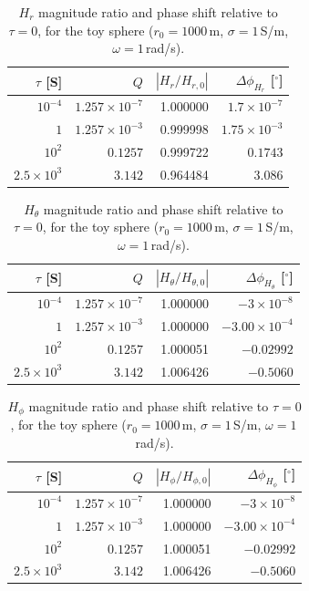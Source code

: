 \documentclass[11pt]{article}
\begin{document}
\begin{table}[h]
\centering
\begin{tabular}{rrrr}
\toprule
$\tau$ [S] & $Q$ & $|H_r/H_{r,0}|$ & $\Delta\phi_{H_r}$ [$^\circ$] \\
\midrule
$10^{-4}$         & $1.257\times10^{-7}$ & 1.000000 & $1.7\times10^{-7}$ \\
$1$               & $1.257\times10^{-3}$ & 0.999998 & $1.75\times10^{-3}$ \\
$10^{2}$          & $0.1257$             & 0.999722 & $0.1743$ \\
$2.5\times10^{3}$ & $3.142$              & 0.964484 & $3.086$ \\
\bottomrule
\end{tabular}
\caption{$H_r$ magnitude ratio and phase shift relative to $\tau=0$, for the toy sphere
($r_0=1000$\,m, $\sigma=1$\,S/m, $\omega=1$\,rad/s).}
\label{tab:phaseHr}
\end{table}

\begin{table}[h]
\centering
\begin{tabular}{rrrr}
\toprule
$\tau$ [S] & $Q$ & $|H_\theta/H_{\theta,0}|$ & $\Delta\phi_{H_\theta}$ [$^\circ$] \\
\midrule
$10^{-4}$         & $1.257\times10^{-7}$ & 1.000000 & $-3\times10^{-8}$ \\
$1$               & $1.257\times10^{-3}$ & 1.000000 & $-3.00\times10^{-4}$ \\
$10^{2}$          & $0.1257$             & 1.000051 & $-0.02992$ \\
$2.5\times10^{3}$ & $3.142$              & 1.006426 & $-0.5060$ \\
\bottomrule
\end{tabular}
\caption{$H_\theta$ magnitude ratio and phase shift relative to $\tau=0$, for the toy sphere
($r_0=1000$\,m, $\sigma=1$\,S/m, $\omega=1$\,rad/s).}
\label{tab:phaseHth}
\end{table}

\begin{table}[h]
\centering
\begin{tabular}{rrrr}
\toprule
$\tau$ [S] & $Q$ & $|H_\phi/H_{\phi,0}|$ & $\Delta\phi_{H_\phi}$ [$^\circ$] \\
\midrule
$10^{-4}$         & $1.257\times10^{-7}$ & 1.000000 & $-3\times10^{-8}$ \\
$1$               & $1.257\times10^{-3}$ & 1.000000 & $-3.00\times10^{-4}$ \\
$10^{2}$          & $0.1257$             & 1.000051 & $-0.02992$ \\
$2.5\times10^{3}$ & $3.142$              & 1.006426 & $-0.5060$ \\
\bottomrule
\end{tabular}
\caption{$H_\phi$ magnitude ratio and phase shift relative to $\tau=0$, for the toy sphere
($r_0=1000$\,m, $\sigma=1$\,S/m, $\omega=1$\,rad/s).}
\label{tab:phaseHph}
\end{table}
\end{document}
